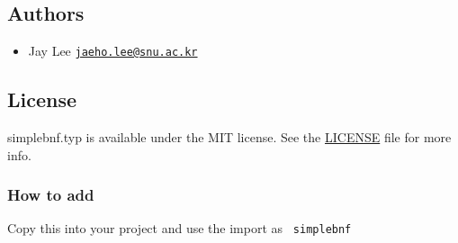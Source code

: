 \pandocbounded{}

\begin{Shaded}
\begin{Highlighting}[]
\NormalTok{    \{}
\NormalTok{    \},}
\NormalTok{  ),}
\NormalTok{    \{}
\NormalTok{    \},}
\NormalTok{  ),}
\NormalTok{)}
\end{Highlighting}
\end{Shaded}

\pandocbounded{}

\subsection{Authors}\label{authors}

\begin{itemize}
\tightlist
\item
  Jay Lee
  \href{mailto:jaeho.lee@snu.ac.kr}{\nolinkurl{jaeho.lee@snu.ac.kr}}
\end{itemize}

\subsection{License}\label{license}

simplebnf.typ is available under the MIT license. See the
\href{https://github.com/Zeta611/simplebnf.typ/blob/master/LICENSE}{LICENSE}
file for more info.

\subsubsection{How to add}\label{how-to-add}

Copy this into your project and use the import as \texttt{\ simplebnf\ }

